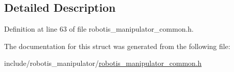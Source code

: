 \subsection{Detailed Description}


Definition at line 63 of file robotis\+\_\+manipulator\+\_\+common.\+h.



The documentation for this struct was generated from the following file\+:\begin{DoxyCompactItemize}
\item 
include/robotis\+\_\+manipulator/\hyperlink{robotis__manipulator__common_8h}{robotis\+\_\+manipulator\+\_\+common.\+h}\end{DoxyCompactItemize}
